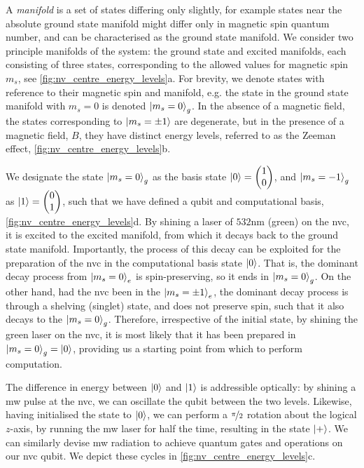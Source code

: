 A \emph{manifold} is a set of states differing only slightly, 
    for example states near the absolute ground state manifold might differ only in magnetic spin quantum number,
    and can be characterised as the ground state manifold. 
We consider two principle manifolds of the system:
    the ground state and excited manifolds, each consisting of 
    three states, corresponding to the allowed values for magnetic spin $m_s$, see \cref{fig:nv_centre_energy_levels}a. 
For brevity, we denote states with reference to their magnetic spin and manifold, 
    e.g. the state in the ground state manifold with $m_s=0$ is denoted $\ket{m_s=0}_g$. 
In the absence of a magnetic field, the states corresponding to $\ket{m_s=\pm1}$ are degenerate, 
    but in the presence of a magnetic field, $B$, they have distinct energy levels, 
    referred to as the Zeeman effect, \cref{fig:nv_centre_energy_levels}b. 
\par 

We designate the state $\ket{m_s=0}_g$ as the basis state $\ket{0}=\left(\begin{matrix}1 \\ 0\end{matrix}\right)$, 
    and $\ket{m_s=-1}_g$ as $\ket{1}=\left(\begin{matrix}0 \\ 1\end{matrix}\right)$, 
    such that we have defined a qubit and computational basis, \cref{fig:nv_centre_energy_levels}d.
By shining a laser of $532$nm (green) on the \gls{nvc}, it is excited to the excited manifold, 
    from which it decays back to the ground state manifold. 
Importantly, the process of this decay can be exploited for the preparation of the \gls{nvc} in 
    the computational basis state $\ket{0}$. 
That is, the dominant decay process from $\ket{m_s=0}_e$ is 
    spin-preserving, so it ends in $\ket{m_s=0}_g$. 
On the other hand, had the \gls{nvc} been in the $\ket{m_s=\pm1}_e$,
    the dominant decay process is through a shelving (singlet) state, 
    and does not preserve spin, such that it also decays to the $\ket{m_s=0}_g$.
Therefore, irrespective of the initial state, 
    by shining the green laser on the \gls{nvc}, 
    it is most likely that it has been prepared in $\ket{m_s=0}_g = \ket{0}$, 
    providing us a starting point from which to perform computation.
\par 

The difference in energy between $\ket{0}$ and $\ket{1}$ is addressible optically: 
    by shining a \gls{mw} pulse at the \gls{nvc}, we can oscillate the qubit between the two levels. 
Likewise, having initialised the state to $\ket{0}$, we can perform a $\nicefrac{\pi}{2}$ rotation 
    about the logical $z$-axis, by running the \gls{mw} laser for half the time, 
    resulting in the state $\ket{+}$. 
We can similarly devise \gls{mw} radiation to achieve quantum gates and operations on our \gls{nvc} qubit.
We depict these cycles in \cref{fig:nv_centre_energy_levels}c. 
\par

